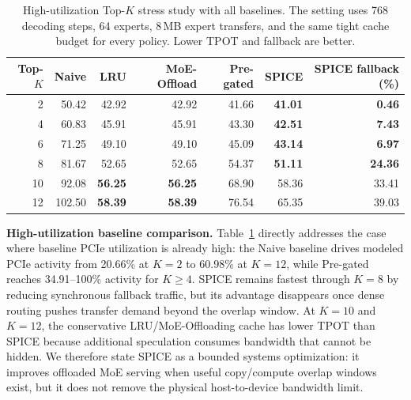 
\begin{table}[t]
\centering
\caption{High-utilization Top-$K$ stress study with all baselines. The setting
uses 768 decoding steps, 64 experts, 8\,MB expert transfers, and the same tight
cache budget for every policy. Lower TPOT and fallback are better.}
\label{tab:supp_topk_baselines}
\scriptsize
\begin{tabular}{rrrrrrr}
\toprule
Top-$K$ & Naive & LRU & MoE-Offload & Pre-gated & SPICE & SPICE fallback (\%) \\
\midrule
2 & 50.42 & 42.92 & 42.92 & 41.66 & \textbf{41.01} & \textbf{0.46} \\
4 & 60.83 & 45.91 & 45.91 & 43.30 & \textbf{42.51} & \textbf{7.43} \\
6 & 71.25 & 49.10 & 49.10 & 45.09 & \textbf{43.14} & \textbf{6.97} \\
8 & 81.67 & 52.65 & 52.65 & 54.37 & \textbf{51.11} & \textbf{24.36} \\
10 & 92.08 & \textbf{56.25} & \textbf{56.25} & 68.90 & 58.36 & 33.41 \\
12 & 102.50 & \textbf{58.39} & \textbf{58.39} & 76.54 & 65.35 & 39.03 \\
\bottomrule
\end{tabular}
\end{table}

\textbf{High-utilization baseline comparison.}
Table~\ref{tab:supp_topk_baselines} directly addresses the case where baseline
PCIe utilization is already high: the Naive baseline drives modeled PCIe
activity from 20.66\% at $K{=}2$ to 60.98\% at $K{=}12$, while Pre-gated reaches
34.91--100\% activity for $K{\ge}4$. SPICE remains fastest through $K{=}8$ by
reducing synchronous fallback traffic, but its advantage disappears once dense
routing pushes transfer demand beyond the overlap window. At $K{=}10$ and
$K{=}12$, the conservative LRU/MoE-Offloading cache has lower TPOT than SPICE
because additional speculation consumes bandwidth that cannot be hidden. We
therefore state SPICE as a bounded systems optimization: it improves offloaded
MoE serving when useful copy/compute overlap windows exist, but it does not
remove the physical host-to-device bandwidth limit.
